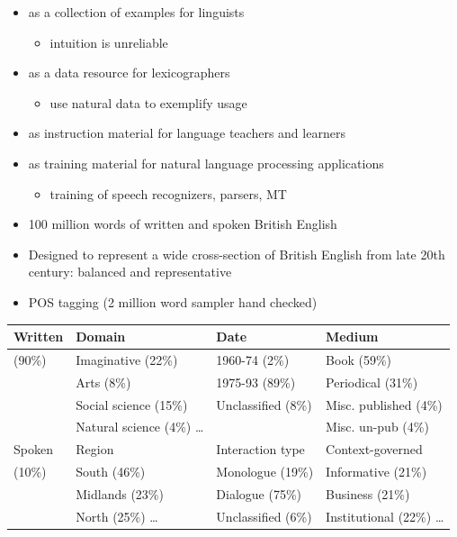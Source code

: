 \documentclass[a4paper,landscape,headrule,footrule,xetex]{foils}
\begin{document}
\begin{itemize}
\item as a collection of examples for linguists
  \begin{itemize}
  \item intuition is unreliable
  \end{itemize}
\item as a data resource for lexicographers
  \begin{itemize}
  \item use natural data to exemplify usage
  \end{itemize}
\item as instruction material for language teachers and learners
\item as training material for natural language processing applications
  \begin{itemize}
  \item training of speech recognizers, parsers, MT
  \end{itemize}
\end{itemize}



\begin{itemize}
\item 100 million words of written and spoken British English
\item Designed to represent a wide cross-section of British English from late 20th century: balanced and representative
\item POS tagging (2 million word sampler hand checked)
\end{itemize}
\begin{small}
  \begin{tabular}{l|lll}
    Written  & Domain  & Date & Medium \\ \hline
    (90\%)  & Imaginative (22\%) & 1960-74 (2\%) & Book (59\%) \\
    & Arts (8\%) & 1975-93 (89\%)  & Periodical (31\%)   \\
    & Social science (15\%)  & Unclassified (8\%)  & Misc. published (4\%) \\
    & Natural science (4\%) \ldots  & & Misc. un-pub (4\%)    \\  \hline
    Spoken  & Region  & Interaction type  & Context-governed \\ \hline
    (10\%)  &  South (46\%)  & Monologue (19\%)  & Informative (21\%) \\
    & Midlands (23\%)  & Dialogue (75\%)  & Business (21\%) \\
    & North (25\%)  \ldots & Unclassified (6\%)  & Institutional (22\%)  \ldots\\
  \end{tabular}
\end{small}
\end{document}
